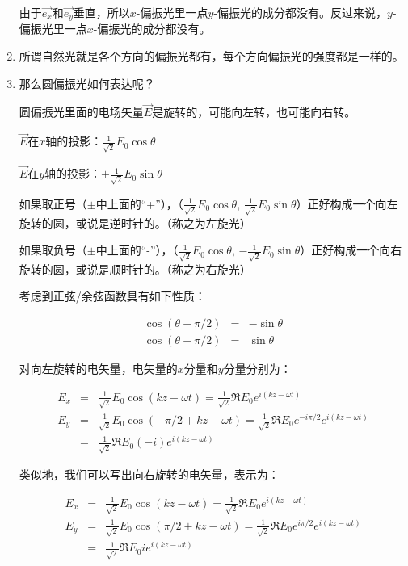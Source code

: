 \begin{enumerate}
由于$\vec {e_x}$和$\vec {e_y}$垂直，所以$x$-偏振光里一点$y$-偏振光的成分都没有。反过来说，$y$-偏振光里一点$x$-偏振光的成分都没有。

\item

所谓自然光就是各个方向的偏振光都有，每个方向偏振光的强度都是一样的。

\item

那么圆偏振光如何表达呢？

圆偏振光里面的电场矢量$\vec E$是旋转的，可能向左转，也可能向右转。

$\vec E$在$x$轴的投影：$ \frac{1}{\sqrt{2}} E_0 \cos \theta$

$\vec E$在$y$轴的投影：$ \pm  \frac{1}{\sqrt{2}} E_0 \sin \theta$

如果取正号（$\pm$中上面的“+”），（$ \frac{1}{\sqrt{2}} E_0 \cos \theta$, $ \frac{1}{\sqrt{2}} E_0 \sin \theta$）正好构成一个向左旋转的圆，或说是逆时针的。（称之为左旋光）

如果取负号（$\pm$中上面的“-”），（$ \frac{1}{\sqrt{2}} E_0 \cos \theta$, $ - \frac{1}{\sqrt{2}} E_0 \sin \theta$）正好构成一个向右旋转的圆，或说是顺时针的。（称之为右旋光）

考虑到正弦/余弦函数具有如下性质：

\begin{eqnarray*}
\cos (\theta + \pi /2 ) &=& - \sin \theta \\
\cos (\theta -  \pi /2 ) &=& \sin \theta
\end{eqnarray*}

对向左旋转的电矢量，电矢量的$x$分量和$y$分量分别为：

\begin{eqnarray*}
E_x &=& \frac{1}{\sqrt{2}}  E_0 \cos (k z - \omega t) = \frac{1}{\sqrt{2}}  \Re E_0 e^{i (k z - \omega t)}  \\
E_y &=& \frac{1}{\sqrt{2}}  E_0 \cos ( - \pi /2 +  kz - \omega t  ) = \frac{1}{\sqrt{2}}  \Re E_0 e^{ - i \pi /2 } e^{i (kz - \omega t)} \\
{} &=& \frac{1}{\sqrt{2}}  \Re E_0 (-i) e^{i (kz - \omega t)} 
\end{eqnarray*}

类似地，我们可以写出向右旋转的电矢量，表示为：

\begin{eqnarray*}
E_x &=& \frac{1}{\sqrt{2}}  E_0 \cos (k z - \omega t) = \frac{1}{\sqrt{2}}  \Re E_0 e^{i (k z - \omega t)}  \\
E_y &=& \frac{1}{\sqrt{2}}  E_0 \cos ( \pi /2 +  kz - \omega t  ) = \frac{1}{\sqrt{2}}  \Re E_0 e^{ i \pi /2 } e^{i (kz - \omega t)} \\
{} & = & \frac{1}{\sqrt{2}}  \Re E_0 i e^{i (kz - \omega t)} 
\end{eqnarray*}


\end{enumerate}
